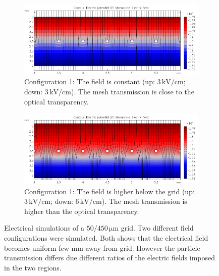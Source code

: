 \begin{figure}[!ht]
	\centering
	\begin{subfigure}{\textwidth}
		\includegraphics[width=\textwidth]{03_Prototype/figures/fig027_Grid1.png}
		\caption[]{Configuration 1: The field is constant (up: \(3\,\mathrm{kV/cm}\); down: \(3\,\mathrm{kV/cm}\)). The mesh transmission is close to the optical transparency.}
		\label{chap3:Grid1}
	\end{subfigure}

	\begin{subfigure}{\textwidth}
		\centering
		\includegraphics[width=\textwidth]{03_Prototype/figures/fig027_Grid2.png}
		\caption[]{Configuration 1: The field is higher below the grid (up: \(3\,\mathrm{kV/cm}\); down: \(6\,\mathrm{kV/cm}\)). The mesh transmission is higher than the optical transparency.}
		\label{chap3:Grid2}
	\end{subfigure}
	\caption[Electrical simulations of a \(50/450\,\mathrm{\mu m}\) grid]{Electrical simulations of a \(50/450\,\mathrm{\mu m}\) grid. Two different field configurations were simulated. Both shows that the electrical field becomes uniform few mm away from grid. However the particle transmission differs due different ratios of the electric fields imposed in the two regions.}
	\label{chap3:Grid}
\end{figure}

